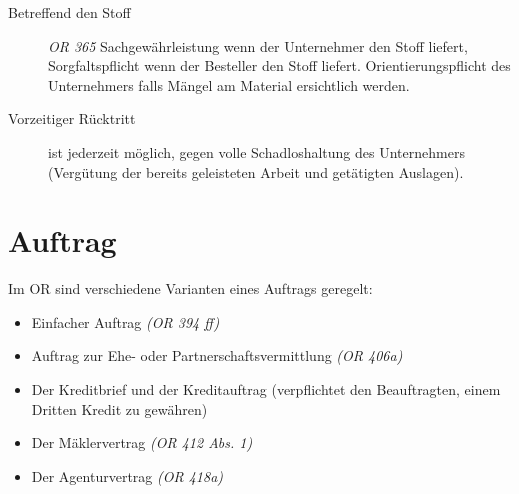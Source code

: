 \begin{description}
  \item[Betreffend den Stoff] \textit{OR 365} Sachgewährleistung wenn der Unternehmer den Stoff liefert, Sorgfaltspflicht wenn der Besteller den Stoff liefert. Orientierungspflicht des Unternehmers falls Mängel am Material ersichtlich werden.
  \item[Vorzeitiger Rücktritt] ist jederzeit möglich, gegen volle Schadloshaltung des Unternehmers (Vergütung der bereits geleisteten Arbeit und getätigten Auslagen).
\end{description}

\section{Auftrag}

Im OR sind verschiedene Varianten eines Auftrags geregelt:
\begin{itemize}
  \item Einfacher Auftrag \textit{(OR 394 ff)}
  \item Auftrag zur Ehe- oder Partnerschaftsvermittlung \textit{(OR 406a)}
  \item Der Kreditbrief und der Kreditauftrag (verpflichtet den Beauftragten, einem Dritten Kredit zu gewähren)
  \item Der Mäklervertrag \textit{(OR 412 Abs. 1)}
  \item Der Agenturvertrag \textit{(OR 418a)}
\end{itemize}


